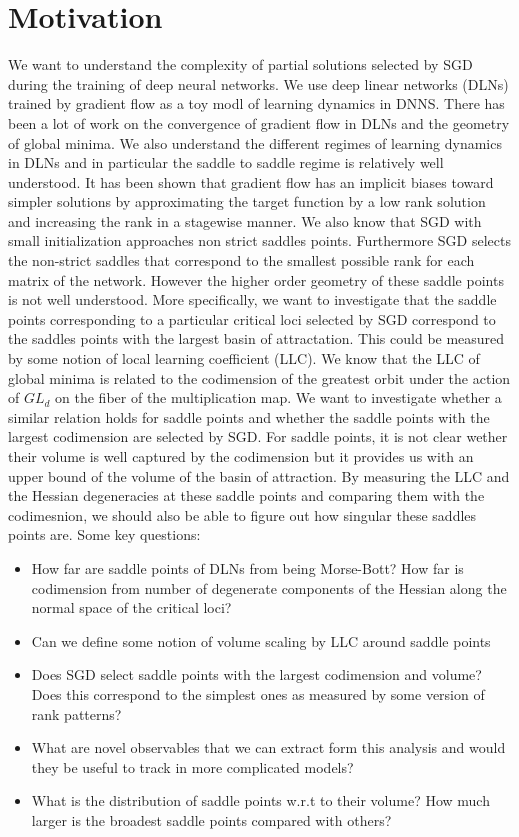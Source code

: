 \documentclass{article}
\theoremstyle{definition}
\begin{document}
\section{Motivation}
We want to understand the complexity of partial solutions selected by SGD during the training of deep neural networks. We use deep linear networks (DLNs) trained by gradient flow as a toy modl of learning dynamics in DNNS. There has been a lot of work on the convergence of gradient flow in DLNs and the geometry of global minima. We also understand the different regimes of learning dynamics in DLNs and in particular the saddle to saddle regime is relatively well understood. It has been shown that gradient flow has an implicit biases toward simpler solutions by approximating the target function by a low rank solution and increasing the rank in a stagewise manner. We also know that SGD with small initialization approaches non strict saddles points. Furthermore SGD selects the non-strict saddles that correspond to the smallest possible rank for each matrix of the network. However the higher order geometry of these saddle points is not well understood. More specifically, we want to investigate that the saddle points corresponding to a particular critical loci selected by SGD correspond to the saddles points with the largest basin of attractation. This could be measured by some notion of local learning coefficient (LLC). We know that the LLC of global minima is related to the codimension of the greatest orbit under the action of $GL_d$ on the fiber of the multiplication map. We want to investigate whether a similar relation holds for saddle points and whether the saddle points with the largest codimension are selected by SGD. For saddle points, it is not clear wether their volume is well captured by the codimension but it provides us with an upper bound of the volume of the basin of attraction. By measuring the LLC and the Hessian degeneracies at these saddle points and comparing them with the codimesnion, we should also be able to figure out how singular these saddles points are. Some key questions:
\begin{itemize}
    \item How far are saddle points of DLNs from being Morse-Bott? How far is codimension from number of degenerate components of the Hessian along the normal space of the critical loci?
    \item Can we define some notion of volume scaling by LLC around saddle points
    \item Does SGD select saddle points with the largest codimension and volume? Does this correspond to the simplest ones as measured by some version of rank patterns?
    \item What are novel observables that we can extract form this analysis and would they be useful to track in more complicated models?
    \item What is the distribution of saddle points w.r.t to their volume? How much larger is the broadest saddle points compared with others?
\end{itemize}
\end{document}
